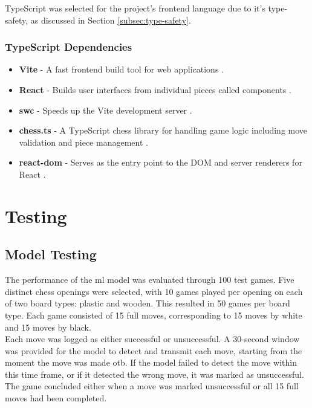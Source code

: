 TypeScript was selected for the project's frontend language due to it's type-safety, as discussed in Section \ref{subsec:type-safety}.

\subsubsection*{TypeScript Dependencies}

\begin{itemize}
    \item \textbf{Vite} - A fast frontend build tool for web applications \cite{ts:vite}.
    
    \item \textbf{React} - Builds user interfaces from individual pieces called components \cite{ts:react}.
    
    \item \textbf{\acrshort{swc}} - Speeds up the Vite development server \cite{ts:swc}.
    
    \item \textbf{chess.ts} - A TypeScript chess library for handling game logic including move validation and piece management \cite{ts:chess}.
    
    \item \textbf{react-dom} - Serves as the entry point to the DOM and server renderers for React \cite{ts:react-dom}.
\end{itemize}

\newpage

\section{Testing}
\label{sec:testing}

\subsection{Model Testing}
\label{subsec:model-testing}
The performance of the \gls{ml} model was evaluated through 100 test  games. Five distinct chess openings were selected, with 10 games played per opening on each of two board types: plastic and wooden. This resulted in 50 games per board type. Each game consisted of 15 full moves, corresponding to 15 moves by white and 15 moves by black. \\

Each move was logged as either successful or unsuccessful. A 30-second window was provided for the model to detect and transmit each move, starting from the moment the move was made \gls{otb}. If the model failed to detect the move within this time frame, or if it detected the wrong move, it was marked as unsuccessful. The game concluded either when a move was marked unsuccessful or all 15 full moves had been completed. \\

